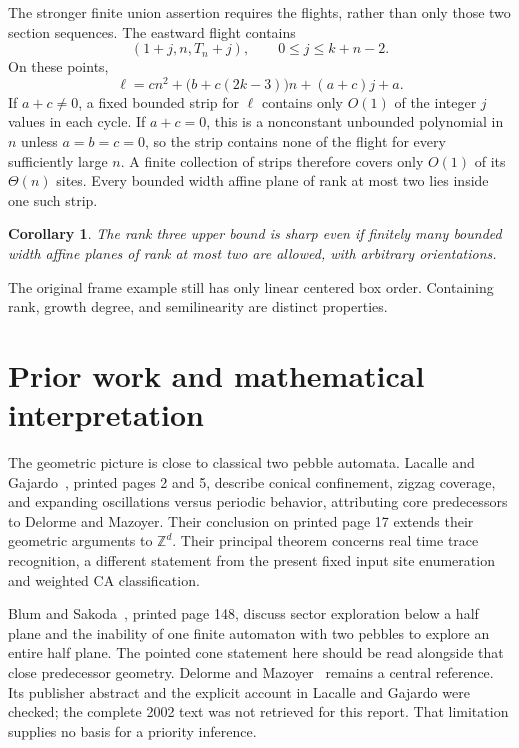 \documentclass[11pt,letterpaper]{article}
\numberwithin{equation}{section}
\newtheorem{corollary}[theorem]{Corollary}
\theoremstyle{definition}
\theoremstyle{remark}
\newcommand{\Z}{\mathbb Z}
\begin{document}
The stronger finite union assertion requires the flights, rather than only those two section sequences. The eastward flight contains
\begin{equation}\label{smc:og:eq:flightgrid}
 (1+j,n,T_n+j),\qquad 0\le j\le k+n-2.
\end{equation}
On these points,
\[
 \ell=c n^2+\bigl(b+c(2k-3)\bigr)n+(a+c)j+a.
\]
If $a+c\ne0$, a fixed bounded strip for $\ell$ contains only $O(1)$ of the integer $j$ values in each cycle. If $a+c=0$, this is a nonconstant unbounded polynomial in $n$ unless $a=b=c=0$, so the strip contains none of the flight for every sufficiently large $n$. A finite collection of strips therefore covers only $O(1)$ of its $\Theta(n)$ sites. Every bounded width affine plane of rank at most two lies inside one such strip.

\begin{corollary}\label{smc:og:cor:rankthree}
The rank three upper bound is sharp even if finitely many bounded width affine planes of rank at most two are allowed, with arbitrary orientations.
\end{corollary}
The original frame example still has only linear centered box order. Containing rank, growth degree, and semilinearity are distinct properties.

\section{Prior work and mathematical interpretation}\label{smc:og:sec:literature}
The geometric picture is close to classical two pebble automata. Lacalle and Gajardo~\cite{lacalle2014}, printed pages 2 and 5, describe conical confinement, zigzag coverage, and expanding oscillations versus periodic behavior, attributing core predecessors to Delorme and Mazoyer. Their conclusion on printed page 17 extends their geometric arguments to $\Z^d$. Their principal theorem concerns real time trace recognition, a different statement from the present fixed input site enumeration and weighted CA classification.

Blum and Sakoda~\cite{blum1977}, printed page 148, discuss sector exploration below a half plane and the inability of one finite automaton with two pebbles to explore an entire half plane. The pointed cone statement here should be read alongside that close predecessor geometry. Delorme and Mazoyer~\cite{delorme2002} remains a central reference. Its publisher abstract and the explicit account in Lacalle and Gajardo were checked; the complete 2002 text was not retrieved for this report. That limitation supplies no basis for a priority inference.
\end{document}
